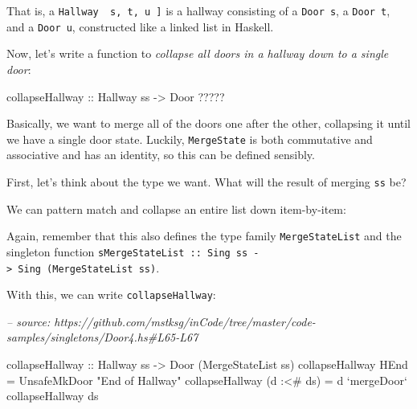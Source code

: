 \documentclass[]{article}
\newenvironment{Shaded}{}{}
\newcommand{\CommentTok}[1]{\textcolor[rgb]{0.38,0.63,0.69}{\textit{#1}}}
\newcommand{\DataTypeTok}[1]{\textcolor[rgb]{0.56,0.13,0.00}{#1}}
\newcommand{\FunctionTok}[1]{\textcolor[rgb]{0.02,0.16,0.49}{#1}}
\newcommand{\NormalTok}[1]{#1}
\newcommand{\OtherTok}[1]{\textcolor[rgb]{0.00,0.44,0.13}{#1}}
\newcommand{\StringTok}[1]{\textcolor[rgb]{0.25,0.44,0.63}{#1}}
\begin{document}
That is, a \texttt{Hallway\ \textquotesingle{}{[}\ s,\ t,\ u\ {]}} is a hallway
consisting of a \texttt{Door\ s}, a \texttt{Door\ t}, and a \texttt{Door\ u},
constructed like a linked list in Haskell.

Now, let's write a function to \emph{collapse all doors in a hallway down to a
single door}:

\begin{Shaded}
\begin{Highlighting}[]
\OtherTok{collapseHallway ::} \DataTypeTok{Hallway}\NormalTok{ ss }\OtherTok{->} \DataTypeTok{Door} \FunctionTok{?????}
\end{Highlighting}
\end{Shaded}

Basically, we want to merge all of the doors one after the other, collapsing it
until we have a single door state. Luckily, \texttt{MergeState} is both
commutative and associative and has an identity, so this can be defined
sensibly.

First, let's think about the type we want. What will the result of merging
\texttt{ss} be?

We can pattern match and collapse an entire list down item-by-item:

\begin{Shaded}
\end{Shaded}

Again, remember that this also defines the type family \texttt{MergeStateList}
and the singleton function
\texttt{sMergeStateList\ ::\ Sing\ ss\ -\textgreater{}\ Sing\ (MergeStateList\ ss)}.

With this, we can write \texttt{collapseHallway}:

\begin{Shaded}
\begin{Highlighting}[]
\CommentTok{-- source: https://github.com/mstksg/inCode/tree/master/code-samples/singletons/Door4.hs#L65-L67}

\OtherTok{collapseHallway ::} \DataTypeTok{Hallway}\NormalTok{ ss }\OtherTok{->} \DataTypeTok{Door}\NormalTok{ (}\DataTypeTok{MergeStateList}\NormalTok{ ss)}
\NormalTok{collapseHallway }\DataTypeTok{HEnd}       \FunctionTok{=} \DataTypeTok{UnsafeMkDoor} \StringTok{"End of Hallway"}
\NormalTok{collapseHallway (d }\FunctionTok{:<#}\NormalTok{ ds) }\FunctionTok{=}\NormalTok{ d }\OtherTok{`mergeDoor`}\NormalTok{ collapseHallway ds}
\end{Highlighting}
\end{Shaded}
\end{document}
